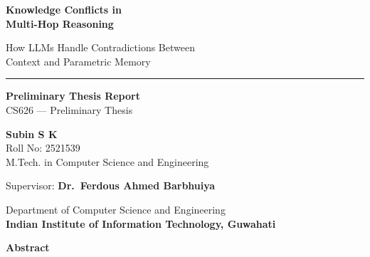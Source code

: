 \documentclass[12pt,a4paper]{article}
\begin{document}

\begin{titlepage}
\centering

\vspace*{1.5cm}

{\huge\textbf{Knowledge Conflicts in\\[0.4cm] Multi-Hop Reasoning}}

\vspace{0.8cm}

{\Large How LLMs Handle Contradictions Between\\[0.2cm] Context and Parametric Memory}

\vspace{1.2cm}

\rule{0.6\textwidth}{0.4pt}

\vspace{1.2cm}

{\large\textbf{Preliminary Thesis Report}}\\[0.4cm]
{\large CS626 --- Preliminary Thesis}

\vspace{1.5cm}

{\Large\textbf{Subin S K}}\\[0.3cm]
{\large Roll No: 2521539}\\[0.2cm]
{\large M.Tech. in Computer Science and Engineering}

\vspace{1.5cm}

{\large Supervisor: \textbf{Dr.\ Ferdous Ahmed Barbhuiya}}

\vspace{1cm}

{\large Department of Computer Science and Engineering}\\[0.3cm]
{\large\textbf{Indian Institute of Information Technology, Guwahati}}

\vfill

\end{titlepage}
\setcounter{page}{1}

\newpage
\thispagestyle{empty}
\begin{center}
{\large\textbf{Abstract}}
\end{center}
\vspace{0.5cm}
\end{document}
